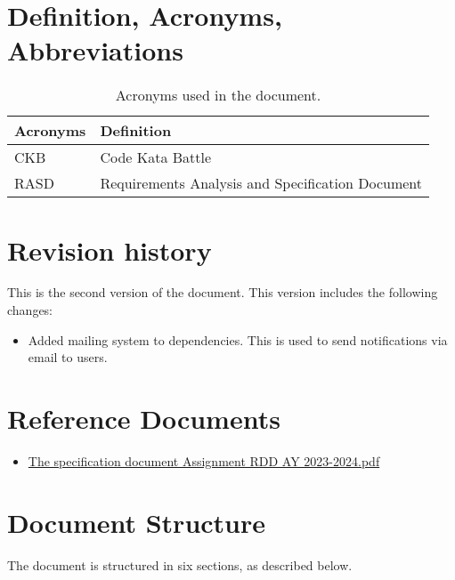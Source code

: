 \section{Definition, Acronyms, Abbreviations}
\label{sec:definition_acronyms_abbreviations}%
\begin{table}[H]
    \begin{center}
        \begin{tabular}{ |l|l| }
            \hline
            \textbf{Acronyms} & \textbf{Definition}                              \\
            \hline
            CKB              & Code Kata Battle                      \\
            \hline
            RASD              & Requirements Analysis and Specification Document \\
            \hline
        \end{tabular}
        \caption{Acronyms used in the document.}
        \label{tab:acronyms}%
    \end{center}
\end{table}


\section{Revision history}
\label{sec:revision_history}%
This is the second version of the document.
This version includes the following changes:
\begin{itemize}
    \item Added mailing system to dependencies. This is used to send notifications via email to users.
\end{itemize}

\section{Reference Documents}
\label{sec:reference_documents}%
\begin{itemize}
    \item \href{https://polimi365-my.sharepoint.com/:b:/g/personal/10710351_polimi_it/EZXUPFfeFKdBkf5M8W-EBYgB2JrrVLr23BYJ4MXQ7kzUkA?e=o0wvyw}{The specification document Assignment RDD AY 2023-2024.pdf}
\end{itemize}


\section{Document Structure}
\label{sec:document_structure}%
The document is structured in six sections, as described below.

